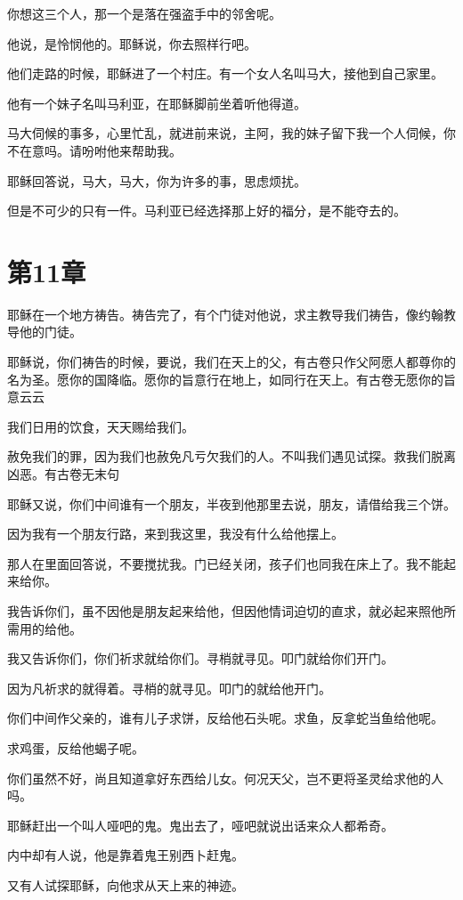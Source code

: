 \documentclass[12pt,oneside]{book}
\begin{document}
你想这三个人，那一个是落在强盗手中的邻舍呢。

他说，是怜悯他的。耶稣说，你去照样行吧。

他们走路的时候，耶稣进了一个村庄。有一个女人名叫马大，接他到自己家里。

他有一个妹子名叫马利亚，在耶稣脚前坐着听他得道。

马大伺候的事多，心里忙乱，就进前来说，主阿，我的妹子留下我一个人伺候，你不在意吗。请吩咐他来帮助我。

耶稣回答说，马大，马大，你为许多的事，思虑烦扰。

但是不可少的只有一件。马利亚已经选择那上好的福分，是不能夺去的。

\chapter{第11章}
耶稣在一个地方祷告。祷告完了，有个门徒对他说，求主教导我们祷告，像约翰教导他的门徒。

耶稣说，你们祷告的时候，要说，我们在天上的父，有古卷只作父阿愿人都尊你的名为圣。愿你的国降临。愿你的旨意行在地上，如同行在天上。有古卷无愿你的旨意云云

我们日用的饮食，天天赐给我们。

赦免我们的罪，因为我们也赦免凡亏欠我们的人。不叫我们遇见试探。救我们脱离凶恶。有古卷无末句

耶稣又说，你们中间谁有一个朋友，半夜到他那里去说，朋友，请借给我三个饼。

因为我有一个朋友行路，来到我这里，我没有什么给他摆上。

那人在里面回答说，不要搅扰我。门已经关闭，孩子们也同我在床上了。我不能起来给你。

我告诉你们，虽不因他是朋友起来给他，但因他情词迫切的直求，就必起来照他所需用的给他。

我又告诉你们，你们祈求就给你们。寻梢就寻见。叩门就给你们开门。

因为凡祈求的就得着。寻梢的就寻见。叩门的就给他开门。

你们中间作父亲的，谁有儿子求饼，反给他石头呢。求鱼，反拿蛇当鱼给他呢。

求鸡蛋，反给他蝎子呢。

你们虽然不好，尚且知道拿好东西给儿女。何况天父，岂不更将圣灵给求他的人吗。

耶稣赶出一个叫人哑吧的鬼。鬼出去了，哑吧就说出话来众人都希奇。

内中却有人说，他是靠着鬼王别西卜赶鬼。

又有人试探耶稣，向他求从天上来的神迹。
\end{document}
